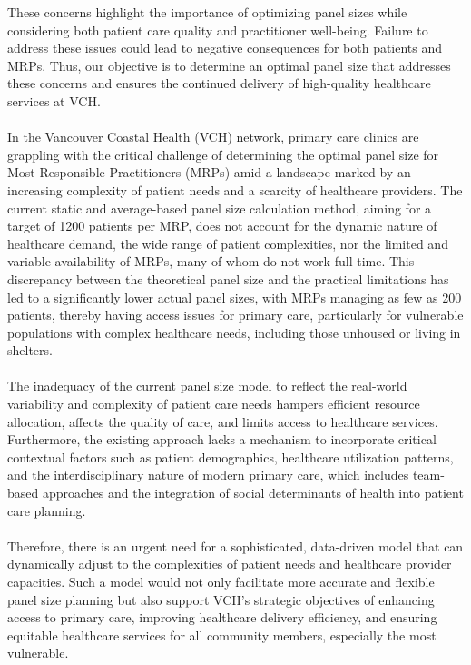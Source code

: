 \documentclass[11pt]{article}
\theoremstyle{definition}
\begin{document}
These concerns highlight the importance of optimizing panel sizes while considering both patient care quality and practitioner well-being. Failure to address these issues could lead to negative consequences for both patients and MRPs. Thus, our objective is to determine an optimal panel size that addresses these concerns and ensures the continued delivery of high-quality healthcare services at VCH.\\\\
In the Vancouver Coastal Health (VCH) network, primary care clinics are grappling with the critical challenge of determining the optimal panel size for Most Responsible Practitioners (MRPs) amid a landscape marked by an increasing complexity of patient needs and a scarcity of healthcare providers. The current static and average-based panel size calculation method, aiming for a target of 1200 patients per MRP, does not account for the dynamic nature of healthcare demand, the wide range of patient complexities, nor the limited and variable availability of MRPs, many of whom do not work full-time. This discrepancy between the theoretical panel size and the practical limitations has led to a significantly lower  actual panel sizes, with MRPs managing as few as 200 patients, thereby having access issues for primary care, particularly for vulnerable populations with complex healthcare needs, including those unhoused or living in shelters.\\\\
The inadequacy of the current panel size model to reflect the real-world variability and complexity of patient care needs hampers efficient resource allocation, affects the quality of care, and limits access to healthcare services. Furthermore, the existing approach lacks a mechanism to incorporate critical contextual factors such as patient demographics, healthcare utilization patterns, and the interdisciplinary nature of modern primary care, which includes team-based approaches and the integration of social determinants of health into patient care planning.\\\\
Therefore, there is an urgent need for a sophisticated, data-driven model that can dynamically adjust to the complexities of patient needs and healthcare provider capacities. Such a model would not only facilitate more accurate and flexible panel size planning but also support VCH’s strategic objectives of enhancing access to primary care, improving healthcare delivery efficiency, and ensuring equitable healthcare services for all community members, especially the most vulnerable.
\end{document}
